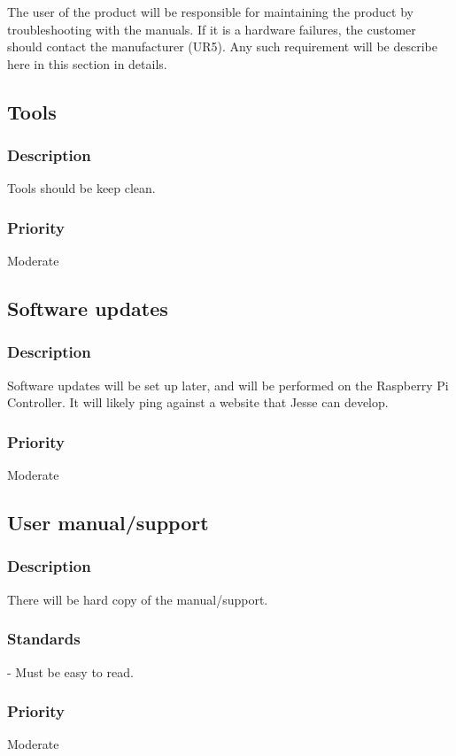 The user of the product will be responsible for maintaining the product by troubleshooting with the manuals. If it is a hardware failures, the customer should contact the manufacturer (UR5). Any such requirement will be describe here in this section in details.

\subsection{Tools}
\subsubsection{Description}
Tools should be keep clean.
\subsubsection{Priority}
Moderate

\subsection{Software updates}
\subsubsection{Description}
Software updates will be set up later, and will be performed on the Raspberry Pi Controller. It will likely ping against a website that Jesse can develop.
\subsubsection{Priority}
Moderate

\subsection{User manual/support}
\subsubsection{Description}
There will be hard copy of the manual/support.

\subsubsection{Standards}
- Must be easy to read. 
\subsubsection{Priority}
Moderate